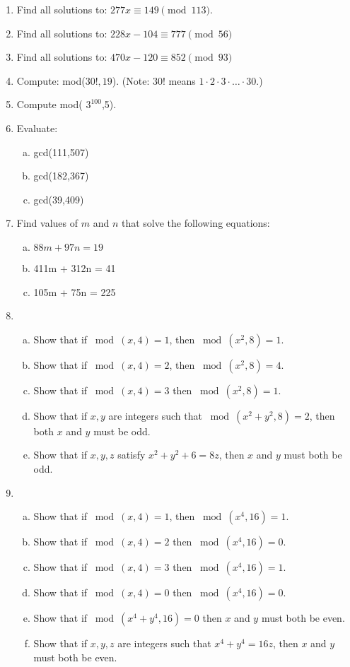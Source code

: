 \begin{enumerate}
\item
Find all solutions to: $277x \equiv 149 \pmod{113}$.

\item
Find all solutions to:  $228 x - 104 \equiv 777 \pmod{56}$


\item
Find all solutions to:  $ 470x - 120 \equiv 852 \pmod{93}$

\item
Compute:  mod($30!,19$).  (Note: $30!$ means $1 \cdot 2 \cdot 3 \cdot \ldots \cdot 30$.)

\item
Compute mod( $3^{100}$,5). 


\item
Evaluate: 
\begin{enumerate}[(a)]
\item
 gcd(111,507) 
\item
gcd(182,367) 
\item
gcd(39,409)
\end{enumerate}

\item
Find values of $m$ and $n$ that solve the following equations:
\begin{enumerate}[(a)]
\item
$88m + 97n = 19$
\item
 411m + 312n = 41 
\item
105m + 75n = 225
\end{enumerate}


\item
\begin{enumerate}[(a)]
\item
Show that if $\bmod(x,4)=1$, then $\bmod(x^2,8)=1$.
\item
Show that if $\bmod(x,4)=2$, then $\bmod(x^2,8) = 4$.
\item
Show that if $\bmod(x,4)=3$ then $\bmod(x^2,8) = 1$.
\item	
Show that if $x,y$  are integers such that $\bmod(x^2+y^2,8)=2$, then both $x$ and $y$ must be odd.
\item	
Show that if $x,y,z$ satisfy $x^2 + y^2 + 6 = 8z$, then $x$ and $y$ must both be odd.
\end{enumerate}

\item
\begin{enumerate}[(a)]	
\item
Show that if $\bmod(x,4)=1$, then $\bmod(x^4,16)=1$.
\item	
Show that if $\bmod(x,4)=2$ then $\bmod(x^4,16) = 0$.
\item	
Show that if $\bmod(x,4)=3$ then $\bmod(x^4,16) = 1$.
\item	
Show that if $\bmod(x,4)=0$ then $\bmod(x^4,16) = 0$.
\item
Show that if $\bmod(x^4+y^4,16) = 0$ then $x$ and $y$ must both be even.
\item	
Show that if $x,y, z$ are integers such that $x^4+y^4 = 16z$, then $x$ and $y$ must both be even.
\end{enumerate}


\end{enumerate}
